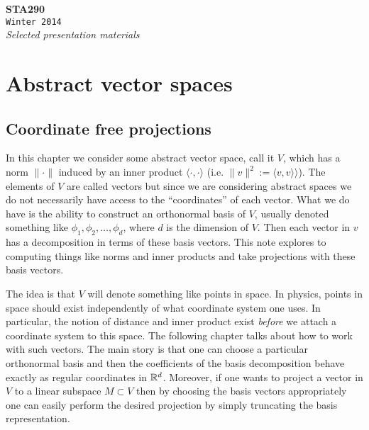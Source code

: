 \documentclass[11pt]{report}
\newcommand{\newchapter}[2]{
	\chapter{#1}
	\addtocontents{toc}{\vspace{.1in} \hspace{.25in} $\cdot$ #2 \par}
}
\newcommand*{\titleTH}{\begingroup %
	\center
	\vspace*{\baselineskip} %
	\vspace{2.5in}
	{\Huge\bfseries STA290}\\[\baselineskip] %
	{\Huge\texttt{Winter 2014}}\\[\baselineskip] %
	{\Large \textit{Selected presentation materials}}\par %
	\vspace*{3\baselineskip} %
\endgroup}
\begin{document}
\titleTH %
\thispagestyle{empty}
\tableofcontents




\chapter{Abstract vector spaces}

\section{Coordinate free projections}


In this chapter we consider some abstract vector space, call it $V$, which has a norm $\|\cdot \|$ induced by an inner product $\langle \cdot, \cdot \rangle$ (i.e. $\|v\|^2 := \langle v, v\rangle\rangle$). The elements of $V$ are called vectors but since we are considering abstract spaces we do not necessarily have access to the ``coordinates'' of each vector. What we do have is the ability to construct an orthonormal basis of $V$, usually denoted something like $\phi_1,\phi_2, \ldots, \phi_d$, where $d$ is the dimension of $V$. Then each vector in $v$ has a decomposition in terms of these basis vectors. This note explores to computing things like norms and inner products and take projections with these basis vectors. 



The idea is that $V$ will denote something like points in space. In physics, points in space should exist independently of what coordinate system one uses. In particular, the notion of distance and inner product exist {\em before} we attach a coordinate system to this space. The following chapter talks about how to work with such vectors. The main story is that one can choose a particular orthonormal basis and then the coefficients of the basis decomposition behave exactly as regular coordinates in $\Bbb R^d$. Moreover, if one wants to project a vector in $V$ to a linear subspace $M\subset V$ then by choosing the basis vectors appropriately one can easily perform the desired projection by simply truncating the basis representation.
\end{document}
